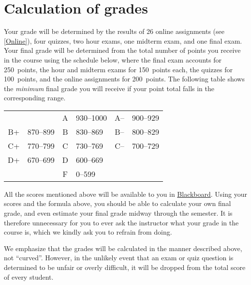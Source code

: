 \documentclass[11pt]{article}
\begin{document}
\section{Calculation of grades}\label{Assessment}
Your grade will be determined by the results of 
26 online assignments (see \autoref{Online}),
four quizzes, two hour exams, one midterm exam, and one 
final exam.
Your final grade will be determined from the total
number of points you receive in the course using the schedule below,
where the final exam accounts for 250~points,
the hour and midterm exams for 150~points each,
the quizzes for 100~points,
and the online assignments for 200~points.
The following table shows the {\em minimum} final grade you will receive
if your point total falls in the corresponding range.
\begin{center}\begin{tabular}{clclcl}
&&A&930--1000
&A--&900--929\\
B+&870--899\qquad\qquad
&B&830--869\qquad\qquad
&B--&800--829\\
C+&770--799
&C&730--769
&C--&700--729\\
D+&670--699
&D&600--669\\
&&F&0--599
\end{tabular}\end{center}
All the scores mentioned above will be available to you in
\href{https://bb.its.iastate.edu}{Blackboard}. Using your scores
and the formula above, you should be able to calculate your own final grade,
and even estimate your final grade midway through the semester.
It is therefore unnecessary for you to ever ask the instructor
what your grade in the course is, which we kindly ask you to refrain from
doing.

We emphasize that the grades will be calculated in the manner described
above, not ``curved''. However, in the unlikely event that an exam or quiz question is determined
to be unfair or overly difficult, it will be dropped from the total score of
every student.
\end{document}
